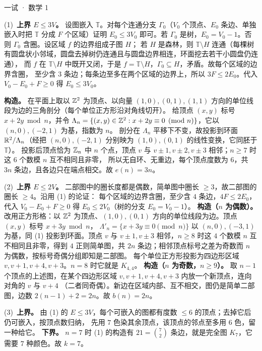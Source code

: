 \documentclass[cjk=noto, seal=first]{mojing-exam}
\begin{document}
\begin{paper}[time={建议 3 小时（训练设置）}, full=150]{一试 · 数学 1}
\begin{questions}
\begin{solution}
(1)~\textbf{上界 $E\le3V$。} 设图嵌入 $\mathbb T$。对每个连通分支 $\Gamma_0$（$V_0$ 个顶点、$E_0$ 条边、单独嵌入时把 $\mathbb T$
分成 $F$ 个区域）证明 $E_0\le3V_0$ 即可。若 $\Gamma_0$ 是树，$E_0=V_0-1$。否则 $\Gamma_0$ 含圈。设区域 $f$ 的边界组成子图 $H$；
若 $H$ 是森林，则 $\mathbb T\setminus H$ 连通（每棵树有圆盘状小邻域，圆盘去掉树仍连通且与圆盘边界相连，环面挖去若干小圆盘仍连通），
而 $f$ 在 $\mathbb T\setminus H$ 中既开又闭，于是 $f=\mathbb T\setminus H$，$\Gamma_0\subseteq H$，矛盾。故每个区域的边界含圈，
至少含 $3$ 条边；每条边至多在两个区域的边界上，所以 $3F\le2E_0$。代入 $V_0-E_0+F\ge0$ 得 $E_0\le3V_0$。

\textbf{构造。} 在平面上取以 $\mathbb{Z}^2$ 为顶点、以向量 $(1,0),(0,1),(1,1)$ 方向的单位线段为边的三角剖分（每个单位正方形沿对角线切开）。
给顶点 $(x,y)$ 标号 $x+2y\bmod n$，并令 $\Lambda_n=\{(x,y)\in\mathbb{Z}^2:x+2y\equiv0\pmod n\}$，它以 $(n,0),(-2,1)$ 为基，指数为 $n$。
剖分在 $\Lambda_n$ 平移下不变，故投影到环面 $\mathbb{R}^2/\Lambda_n$（经把 $(n,0),(-2,1)$ 分别映为 $(1,0),(0,1)$ 的线性变换，它同胚于 $\mathbb T$）。
投影后顶点恰为 $\mathbb{Z}_n$ 中 $n$ 个点，顶点 $v$ 与 $v\pm1,v\pm2,v\pm3$ 相邻；$n\ge7$ 时这 $6$ 个数模 $n$ 互不相同且非零，
所以无自环、无重边，每个顶点度数为 $6$，共 $3n$ 条边，且各边只在端点相交。故 $e(n)=3n$。

(2)~\textbf{上界 $E\le2V$。} 二部图中的圈长度都是偶数，简单图中圈长 $\ge3$，故二部图的圈长 $\ge4$。沿用 (1) 的论证：
每个区域的边界含圈，至少含 $4$ 条边，$4F\le2E_0$，代入 $V_0-E_0+F\ge0$ 得 $E_0\le2V_0$（树的分支 $E_0=V_0-1$）。
\textbf{构造（$n$ 为偶数）。} 改用正方形格：以 $\mathbb{Z}^2$ 为顶点、$(1,0),(0,1)$ 方向的单位线段为边。顶点 $(x,y)$ 标号 $x+3y\bmod n$，
$\Lambda'_n=\{x+3y\equiv0\pmod n\}$ 以 $(n,0),(-3,1)$ 为基，同 (1) 投影到环面。顶点 $v$ 与 $v\pm1,v\pm3$ 相邻，$n\ge8$ 时这 $4$ 个数模 $n$
互不相同且非零，得到 $4$ 正则简单图，共 $2n$ 条边；相邻顶点标号之差为奇数而 $n$ 为偶数，按标号奇偶分组即知是二部图。
每个单位正方形投影为四边形区域 $v,v+1,v+4,v+3$。$n=8$ 时它就是 $K_{4,4}$。
\textbf{构造（$n$ 为奇数，$n\ge9$）。} 取 $n-1$ 个顶点的上述图，在某个四边形区域 $v,v+1,v+4,v+3$ 内放一个新顶点，连向对角的 $v$ 与 $v+4$
（二者同奇偶）。新边在区域内部、互不相交，图仍是简单二部图，边数 $2(n-1)+2=2n$。故 $b(n)=2n$。

(3)~\textbf{上界。} 由 (1) 的 $E\le3V$，每个可嵌入的图都有度数 $\le6$ 的顶点；去掉它后仍可嵌入，按顶点数归纳，
先用 $7$ 色染其余顶点，该顶点的邻点至多用 $6$ 色，留一种给它。
\textbf{下界。} $n=7$ 时 (1) 的构造有 $21=\binom72$ 条边，就是完全图 $K_7$，它需要 $7$ 种颜色。故 $k=7$。


\end{solution}
\end{questions}
\end{paper}
\end{document}
